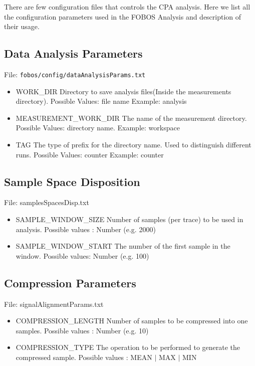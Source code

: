 There are few configuration files that controls the CPA analysis.
Here we list all the configuration parameters used in the FOBOS Analysis and description of their usage.
\subsection{Data Analysis Parameters}

File: \texttt{fobos/config/dataAnalysisParams.txt}
\begin{itemize}
 \item WORK\_DIR \newline
 Directory to save analysis files(Inside the measurements directory). \newline
 Possible Values: file name \newline
 Example: analysis 
 \item MEASUREMENT\_WORK\_DIR \newline
 The name of the measurement directory. \newline
 Possible Values: directory name. \newline
 Example: workspace
 \item TAG \newline
 The type of prefix for the directory name. Used to distinguish different runs. \newline
 Possible Values: counter \newline
 Example: counter
\end{itemize}

\subsection{Sample Space Disposition}

File: samplesSpacesDisp.txt
\begin{itemize}
 \item SAMPLE\_WINDOW\_SIZE \newline
  Number of samples (per trace) to be used in analysis. \newline
  Possible values : Number (e.g. 2000)
 \item SAMPLE\_WINDOW\_START \newline
 The number of the first sample in the window.\newline
 Possible values: Number (e.g. 100)
\end{itemize}

\subsection{Compression Parameters}
File: signalAlignmentParams.txt
\begin{itemize}
 \item COMPRESSION\_LENGTH \newline
 Number of samples to be compressed into one samples. \newline 
 Possible values : Number (e.g. 10)
 \item COMPRESSION\_TYPE \newline 
 The operation to be performed to generate the compressed sample.\newline
 Possible values : MEAN $|$ MAX $|$ MIN
\end{itemize}


